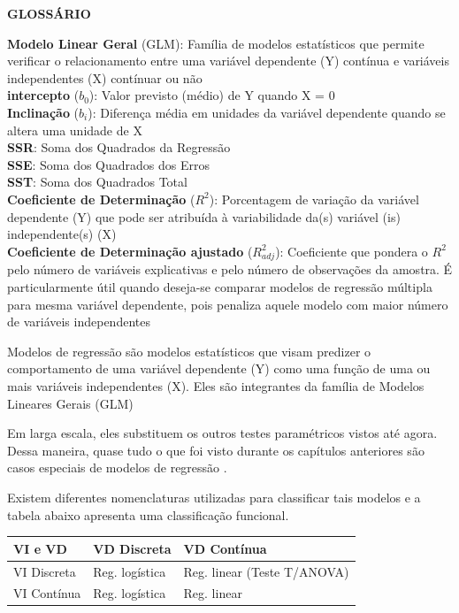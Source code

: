 \documentclass[
]{book}
\begin{document}
\textbf{GLOSSÁRIO}

\textbf{Modelo Linear Geral} (GLM): Família de modelos estatísticos que permite verificar o relacionamento entre uma variável dependente (Y) contínua e variáveis independentes (X) contínuar ou não\\
\textbf{intercepto} (\(b_0\)): Valor previsto (médio) de Y quando X = 0\\
\textbf{Inclinação} (\(b_i\)): Diferença média em unidades da variável dependente quando se altera uma unidade de X\\
\textbf{SSR}: Soma dos Quadrados da Regressão\\
\textbf{SSE}: Soma dos Quadrados dos Erros\\
\textbf{SST}: Soma dos Quadrados Total\\
\textbf{Coeficiente de Determinação} (\(R^2\)): Porcentagem de variação da variável dependente (Y) que pode ser atribuída à variabilidade da(s) variável (is) independente(s) (X)\\
\textbf{Coeficiente de Determinação ajustado} (\(R^2_{adj}\)): Coeficiente que pondera o \(R^2\) pelo número de variáveis explicativas e pelo número de observações da amostra. É particularmente útil quando deseja-se comparar modelos de regressão múltipla para mesma variável dependente, pois penaliza aquele modelo com maior número de variáveis independentes

Modelos de regressão são modelos estatísticos que visam predizer o comportamento de uma variável dependente (Y) como uma função de uma ou mais variáveis independentes (X). Eles são integrantes da família de Modelos Lineares Gerais (GLM)

Em larga escala, eles substituem os outros testes paramétricos vistos até agora. Dessa maneira, quase tudo o que foi visto durante os capítulos anteriores são casos especiais de modelos de regressão \citep{Chartier2008}.

Existem diferentes nomenclaturas utilizadas para classificar tais modelos e a tabela abaixo apresenta uma classificação funcional.

\begin{longtable}[]{@{}lll@{}}
\toprule
VI e VD & VD Discreta & VD Contínua \\
\midrule
\endhead
VI Discreta & Reg. logística & Reg. linear (Teste T/ANOVA) \\
VI Contínua & Reg. logística & Reg. linear \\
\bottomrule
\end{longtable}
\end{document}
